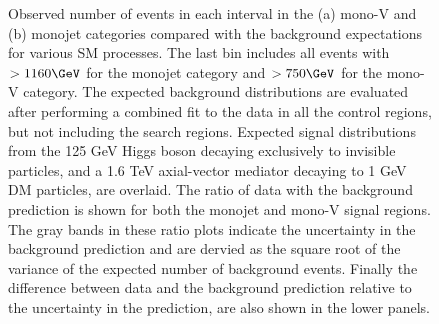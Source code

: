 \begin{figure}[hbt!]
\begin{center}
\caption{
      Observed number of events in each \ETmiss interval in the (a) mono-V and (b) monojet categories compared with the background expectations for various SM processes.
      The last bin includes all events with \ETmiss$ > 1160 \GeV$ for the monojet category and \ETm$ > 750 \GeV$ for the mono-V category.
      The expected background distributions are evaluated after performing a combined fit to the data in all the control regions, but not including the search regions.
      Expected signal distributions from the 125 GeV Higgs boson decaying exclusively to invisible particles, and a 1.6 TeV axial-vector mediator decaying to 1 GeV DM particles, are overlaid.
      The ratio of data with the background prediction is shown for both the monojet and mono-V signal regions.
      The gray bands in these ratio plots indicate the uncertainty in the background prediction and are dervied as the square root of the variance of the expected number of background events.
      Finally the difference between data and the background prediction relative to the uncertainty in the prediction,
      are also shown in the lower panels.
   }
   \label{fig:monojetv} 
  \end{center}
\end{figure}


